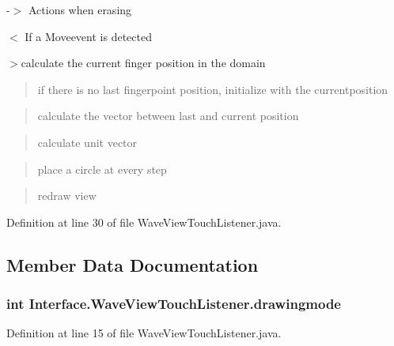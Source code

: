 -\/$>$ Actions when erasing

$<$ If a Moveevent is detected

$>$calculate the current finger position in the domain

\begin{quote}
if there is no last fingerpoint position, initialize with the currentposition \end{quote}


\begin{quote}
calculate the vector between last and current position \end{quote}


\begin{quote}
calculate unit vector \end{quote}


\begin{quote}
place a circle at every step \end{quote}


\begin{quote}
redraw view \end{quote}


Definition at line 30 of file Wave\+View\+Touch\+Listener.\+java.



\subsection{Member Data Documentation}
\subsubsection[{\texorpdfstring{drawingmode}{drawingmode}}]{\setlength{\rightskip}{0pt plus 5cm}int Interface.\+Wave\+View\+Touch\+Listener.\+drawingmode}\hypertarget{classInterface_1_1WaveViewTouchListener_ae2d6ed28e08195e8313ec6903f18f77a}{}\label{classInterface_1_1WaveViewTouchListener_ae2d6ed28e08195e8313ec6903f18f77a}


Definition at line 15 of file Wave\+View\+Touch\+Listener.\+java.

